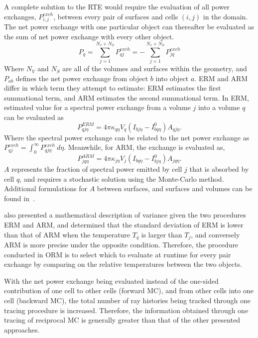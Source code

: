 A complete solution to the RTE would require the evaluation of all power exchanges, $P_{i,j}^{exch}$, between every pair of surfaces and cells $(i,j)$ in the domain.
The net power exchange with one particular object can thereafter be evaluated as the sum of net power exchange with every other object.
\begin{equation}
    P_q=\sum_{j=1}^{N_v+N_S}P_{qj}^{exch}=-\sum_{j=1}^{N_v+N_S}P_{jq}^{exch}
    \label{eq:power_exchange}
\end{equation}
Where $N_V$ and $N_S$ are all of the volumes and surfaces within the geometry, and
$P_{ab}$ defines the net power exchange from object $b$ into object $a$.
ERM and ARM differ in which term they attempt to estimate: ERM estimates the first summational term, and ARM estimates the second summational term.
In ERM, estimated value for a spectral power exchange from a volume $j$ into a volume $q$ can be evaluated as
\begin{equation}
    P_{qj\eta}^{ERM}=4\pi{}\kappa_{q\eta}V_q(I_{bj\eta}-I^0_{bq\eta})A_{qj\eta}.
    \label{eq:fraction_spectralpower_ERM}
\end{equation}
Where the spectral power exchange can be related to the net power exchange as $P_{qj}^{exch}=\int_0^\infty{}P_{qj\eta}^{exch}~d\eta$.
Meanwhile, for ARM, the exchange is evaluated as,
\begin{equation}
    P_{jq\eta}^{ARM}=4\pi{}\kappa_{j\eta}V_j(I_{bq\eta}-I^0_{bj\eta})A_{jq\eta}.
    \label{eq:power_exchange_ARM}
\end{equation}
$A$ represents the fraction of spectral power emitted by cell $j$ that is absorbed by cell $q$, and requires a stochastic solution using the Monte-Carlo method. Additional formulations for $A$ between surfaces, and surfaces and volumes can be found in~\citet{Dupoirieux2006AnThicknesses}.

\citet{Dupoirieux2006AnThicknesses} also presented a mathematical description of variance given the two procedures ERM and ARM, and determined that the standard deviation of ERM is lower than that of ARM when the temperature $T_q$ is larger than $T_j$, and conversely ARM is more precise under the opposite condition.
Therefore, the procedure conducted in ORM is to select which to evaluate at runtime for every pair exchange by comparing on the relative temperatures between the two objects.

With the net power exchange being evaluated instead of the one-sided contribution of one cell to other cells (forward MC), and from other cells into one cell (backward MC), the total number of ray histories being tracked through one tracing procedure is increased.
Therefore, the information obtained through one tracing of reciprocal MC is generally greater than that of the other presented approaches.

